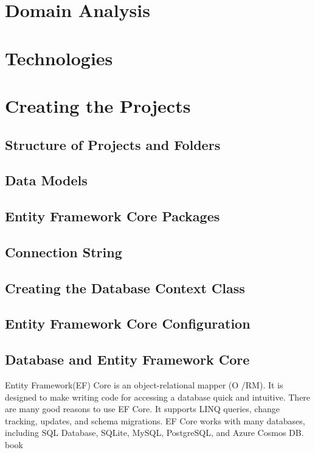 \documentclass{scrartcl}
\begin{document}
\section{Domain Analysis}

\section{Technologies}

\section{Creating the Projects}

\subsection{Structure of Projects and Folders}

\subsection{Data Models}

\subsection{Entity Framework Core Packages}

\subsection{Connection String}

\subsection{Creating the Database Context Class}

\subsection{Entity Framework Core Configuration}

\subsection{Database and Entity Framework Core}
Entity Framework(EF) Core is an object-relational mapper (O /RM). It is designed to make writing code for accessing a database quick and intuitive.
There are many good reasons to use EF Core. It supports LINQ queries, change tracking, updates, and schema migrations. EF Core works with many databases, including SQL Database, SQLite, MySQL, PostgreSQL, and Azure Cosmos DB.
book \cite{efa} \cite{ef}
\end{document}
